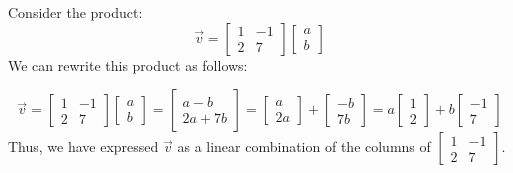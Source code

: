 \documentclass{ximera}
\begin{document}
\begin{initprob}
Consider the product:
$$\vec{v}=\begin{bmatrix}
1&-1\\
2&7
\end{bmatrix}\begin{bmatrix} a\\b\end{bmatrix}$$
We can rewrite this product as follows:

$$\vec{v}=\begin{bmatrix}
1&-1\\
2&7
\end{bmatrix}\begin{bmatrix} a\\b\end{bmatrix}=\begin{bmatrix} a-b\\2a+7b\end{bmatrix}=\begin{bmatrix} a\\2a\end{bmatrix}+\begin{bmatrix} -b\\7b\end{bmatrix}=a\begin{bmatrix} 1\\2\end{bmatrix}+b\begin{bmatrix} -1\\7\end{bmatrix}$$
Thus, we have expressed $\vec{v}$ as a linear combination of the columns of $\begin{bmatrix}
1&-1\\
2&7
\end{bmatrix}$. 

\end{initprob}
\end{document}
